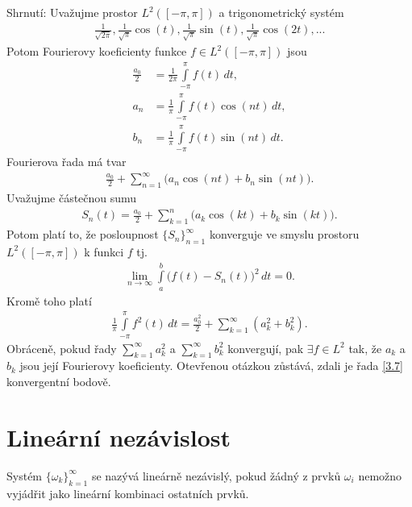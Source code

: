 Shrnutí: Uvažujme prostor $L^2 ([ -\pi, \pi])$ a trigonometrický systém
\begin{align*}
\frac{1}{\sqrt{2\pi}}, \frac{1}{\sqrt{\pi}} \cos(t), \frac{1}{\sqrt{\pi}} \sin(t), \frac{1}{\sqrt{\pi}} \cos(2t),...
\end{align*}
Potom Fourierovy koeficienty funkce $f \in L^2([-\pi, \pi])$ jsou
\begin{align*}
\frac{a_0}{2} &= \frac{1}{2\pi} \int \limits_{-\pi}^\pi f(t) \, dt,\\
a_n &= \frac{1}{\pi} \int \limits_{-\pi}^\pi f(t) \cos (nt) \, dt,\\
b_n &= \frac{1}{\pi} \int \limits_{-\pi}^\pi f(t) \sin (nt) \, dt.
\end{align*}
Fourierova řada má tvar
\begin{align}\label{3.7}
\frac{a_0}{2} + \sum \limits _{n=1}^{\infty} \Big(a_n \cos (nt) + b_n \sin (nt)\Big).
\end{align}
Uvažujme částečnou sumu
\begin{align*}
S_n(t) = \frac{a_0}{2} + \sum \limits _{k=1}^n \Big(a_k \cos (kt) + b_k \sin (kt)\Big).
\end{align*}
Potom platí to, že posloupnost $\{S_n\}_{n=1}^{\infty}$ konverguje ve smyslu prostoru $L^2 ([-\pi, \pi])$ k funkci $f$ tj.
\begin{align*}
\lim_{n \rightarrow \infty} \int \limits_a^b \Big(f(t) - S_n(t)\Big)^2 \, dt = 0.
\end{align*}
Kromě toho platí
\begin{align*}
\frac{1}{\pi} \int \limits_{-\pi}^\pi f^2(t) \, dt = \frac{a_0^2}{2} + \sum \limits _{k=1}^{\infty} (a_k^2 + b_k^2).
\end{align*}
Obráceně, pokud řady $\sum \limits _{k=1}^{\infty} a_k^2$ a $\sum \limits _{k=1}^{\infty} b_k^2$ konvergují, pak $\exists f \in L^2$ tak, že $a_k$ a $b_k$ jsou její Fourierovy koeficienty. Otevřenou otázkou zůstává, zdali je řada \ref{3.7} konvergentní bodově.



\section{Lineární nezávislost}

\begin{definition}\label{3.31.definition}
Systém $\{ \omega_k \}_{k=1}^{\infty}$ se nazývá lineárně nezávislý, pokud žádný z prvků $\omega_i$ nemožno vyjádřit jako lineární kombinaci ostatních prvků.
\end{definition}

